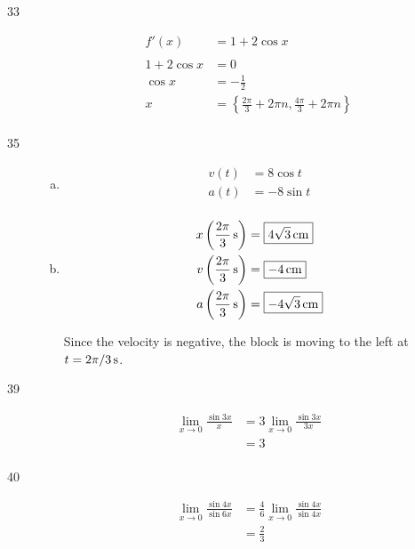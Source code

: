 \documentclass[letterpaper, landscape]{exam}
\begin{document}
\begin{description}
    \item[33] 
      \begin{align*}
        f'(x)        & = 1 + 2 \cos x \\
        \\
        1 + 2 \cos x & = 0 \\
        \cos x       & = - \frac{1}{2} \\
        x            & = \boxed{ \left\{ \frac{2 \pi}{3} + 2 \pi n, \frac{4 \pi}{3} + 2 \pi n \right\} } \\
      \end{align*}

    \item[35] 
      \begin{enumerate}[(a)]
        \item 
          \begin{align*}
            v(t)   & = \boxed{ 8 \cos t } \\
            a(t)   & = \boxed{ - 8 \sin t } \\
          \end{align*}

        \item 
          \begin{align*}
            x \left(\unit[\frac{2 \pi}{3}]{s} \right) & = \boxed{ \unit[4 \sqrt{3}]{cm} } \\
            v \left(\unit[\frac{2 \pi}{3}]{s} \right) & = \boxed{ \unit[-4]{cm} } \\
            a \left(\unit[\frac{2 \pi}{3}]{s} \right) & = \boxed{ \unit[- 4 \sqrt{3}]{cm} } \\
          \end{align*}

          Since the velocity is negative, the block is moving to the left at 
          $t = \unit[2 \pi/3]{s}$.

      \end{enumerate}

    \item[39] 
      \begin{align*}
        \lim_{x \to 0} \frac{\sin 3x}{x} & = 3 \lim_{x \to 0} \frac{\sin 3x}{3x} \\
                                         & = \boxed{ 3 } \\
      \end{align*}

    \item[40] 
      \begin{align*}
        \lim_{x \to 0} \frac{\sin 4x}{\sin 6x} & = \frac{4}{6} \lim_{x \to 0} \frac{\sin 4x}{\sin 4x} \\
                                               & = \boxed{ \frac{2}{3} } \\
      \end{align*}


\end{description}
\end{document}
